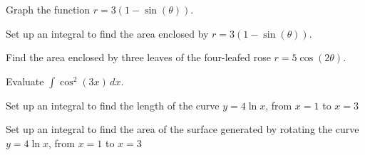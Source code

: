 \documentclass{exam}[12pt]
\begin{document}
\pagestyle{head}

\small{\textit{
}}

\begin{questions}
\large{

\question Graph the function $r=3(1 - \sin(\theta))$.
\vspace{2.2in}

\question Set up an integral to find the area enclosed by
 $r=3(1-\sin(\theta))$.
\vspace{2.2in}

\question Find the area enclosed by three leaves
of the four-leafed rose $r=5\cos(2\theta)$.
\vspace{2in}

\question Evaluate $\int \cos^2(3x)\, dx$.
\vspace{3in}

\question Set up an integral to find the length of the curve $y=4\ln x$, from $x=1$ to $x=3$

\question Set up an integral to find the area of the surface generated by rotating the curve $y=4\ln x$, from $x=1$ to $x=3$


}
\end{questions}
\end{document}
